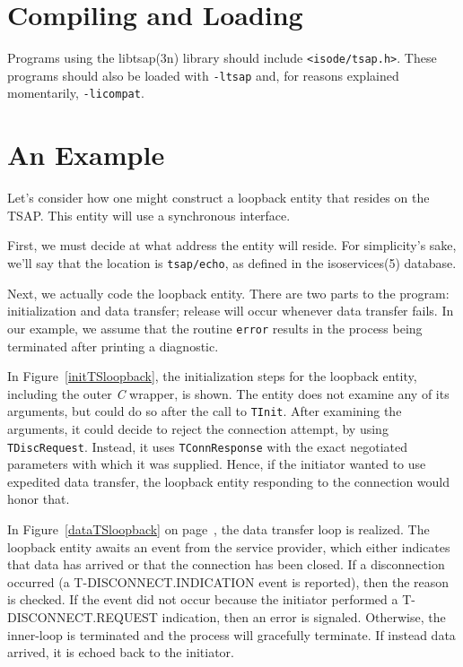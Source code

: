 \section	{Compiling and Loading}
Programs using the \man libtsap(3n) library should include
\verb"<isode/tsap.h>".
These programs should also be loaded with \verb"-ltsap" and,
for reasons explained momentarily,
\verb"-licompat".

\section	{An Example}
Let's consider how one might construct a loopback entity that resides on the
TSAP.
This entity will use a synchronous interface.

First, we must decide at what address the entity will reside.
For simplicity's sake,
we'll say that the location is \verb"tsap/echo",
as defined in the \man isoservices(5) database.

Next, we actually code the loopback entity.
There are two parts to the program: initialization and data transfer;
release will occur whenever data transfer fails.
In our example,
we assume that the routine \verb"error" results in the process being
terminated after printing a diagnostic.

In Figure~\ref{initTSloopback},
the initialization steps for the loopback entity,
including the outer {\em C\/} wrapper, is shown.
The entity does not examine any of its arguments,
but could do so after the call to \verb"TInit".
After examining the arguments,
it could decide to reject the connection attempt,
by using \verb"TDiscRequest".
Instead,
it uses \verb"TConnResponse" with the exact negotiated parameters with which
it was supplied.
Hence,
if the initiator wanted to use expedited data transfer,
the loopback entity responding to the connection would honor that.

In Figure~\ref{dataTSloopback} on page~\pageref{dataTSloopback},
the data transfer loop is realized.
The loopback entity awaits an event from the service provider,
which either indicates that data has arrived or that the connection has been
closed.
If a disconnection occurred
(a {\sf T-DISCONNECT.INDICATION\/} event is reported),
then the reason is checked.
If the event did not occur because the initiator performed a
{\sf T-DISCONNECT.REQUEST\/} indication,
then an error is signaled.
Otherwise, the inner-loop is terminated and the process will gracefully
terminate.
If instead data arrived,
it is echoed back to the initiator.
\clearpage
{}
\clearpage
{}

